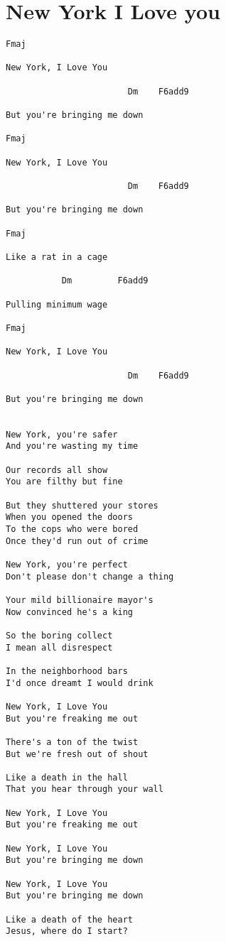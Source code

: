 \documentclass[leqno]{memoir}
\begin{document}
\chapter{New York I Love you}
\begin{verbatim}
Fmaj

New York, I Love You

                        Dm    F6add9

But you're bringing me down

Fmaj

New York, I Love You

                        Dm    F6add9

But you're bringing me down

Fmaj

Like a rat in a cage

           Dm         F6add9

Pulling minimum wage

Fmaj

New York, I Love You

                        Dm    F6add9

But you're bringing me down


New York, you're safer
And you're wasting my time

Our records all show
You are filthy but fine

But they shuttered your stores
When you opened the doors
To the cops who were bored
Once they'd run out of crime

New York, you're perfect
Don't please don't change a thing

Your mild billionaire mayor's
Now convinced he's a king

So the boring collect
I mean all disrespect

In the neighborhood bars
I'd once dreamt I would drink

New York, I Love You
But you're freaking me out

There's a ton of the twist
But we're fresh out of shout

Like a death in the hall
That you hear through your wall

New York, I Love You
But you're freaking me out

New York, I Love You
But you're bringing me down

New York, I Love You
But you're bringing me down

Like a death of the heart
Jesus, where do I start?


\end{verbatim}
\end{document}
